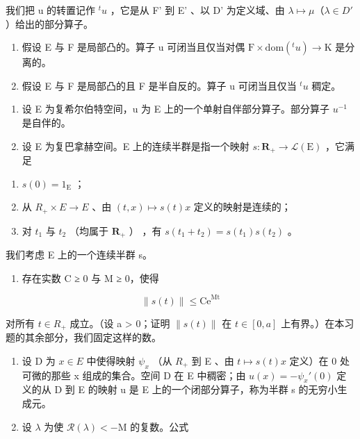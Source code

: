 我们把 u 的转置记作 \(^{t}u\) ，它是从 F' 到 E' 、以 D' 为定义域、由 \(\lambda\mapsto\mu\)（\(\lambda\in D'\) ）给出的部分算子。

\begin{enumerate}
\def\labelenumi{\alph{enumi})}
\setcounter{enumi}{1}
\item
  假设 E 与 F 是局部凸的。算子 u 可闭当且仅当对偶 \(\mathrm{F} \times \mathrm{dom}(^{t}u) \to \mathrm{K}\) 是分离的。
\item
  假设 E 与 F 是局部凸的且 F 是半自反的。算子 u 可闭当且仅当 \(^{t}u\) 稠定。
\end{enumerate}

\begin{enumerate}
\def\labelenumi{\arabic{enumi})}
\setcounter{enumi}{3}
\item
  设 E 为复希尔伯特空间，u 为 E 上的一个单射自伴部分算子。部分算子 \(u^{-1}\) 是自伴的。
\item
  设 E 为复巴拿赫空间。E 上的连续半群是指一个映射 \(s\colon\mathbf{R}_{+}\to\mathcal{L}(\mathrm{E})\) ，它满足
\end{enumerate}

\begin{enumerate}
\def\labelenumi{(\roman{enumi})}
\item
  \(s(0) = 1_{\mathrm{E}}\) ；
\item
  从 \(R_{+} \times E \to E\) 、由 \((t, x) \mapsto s(t)x\) 定义的映射是连续的；
\item
  对 \(t_1\) 与 \(t_2\) （均属于 \(\mathbf{R}_{+}\) ） ，有 \(s(t_1 + t_2) = s(t_1)s(t_2)\) 。
\end{enumerate}

我们考虑 E 上的一个连续半群 s。

\begin{enumerate}
\def\labelenumi{\alph{enumi})}
\tightlist
\item
  存在实数 C ≥ 0 与 M ≥ 0，使得
\end{enumerate}

\[
\| s (t) \| \leqslant \mathrm{Ce} ^ {\mathrm{Mt}}
\]

对所有 \(t \in R_{+}\) 成立。（设 a \textgreater{} 0；证明 \(\|s(t)\|\) 在 \(t \in [0, a]\) 上有界。）在本习题的其余部分，我们固定这样的数。

\begin{enumerate}
\def\labelenumi{\alph{enumi})}
\setcounter{enumi}{1}
\item
  设 D 为 \(x \in E\) 中使得映射 \(\psi_{x}\) （从 \(R_{+}\) 到 E 、由 \(t \mapsto s(t)x\) 定义）在 0 处可微的那些 x 组成的集合。空间 D 在 E 中稠密；由 \(u(x) = -\psi_{x}'(0)\) 定义的从 D 到 E 的映射 u 是 E 上的一个闭部分算子，称为半群 s 的无穷小生成元。
\item
  设 \(\lambda\) 为使 \(\mathcal{R}(\lambda) < -\mathrm{M}\) 的复数。公式
\end{enumerate}

